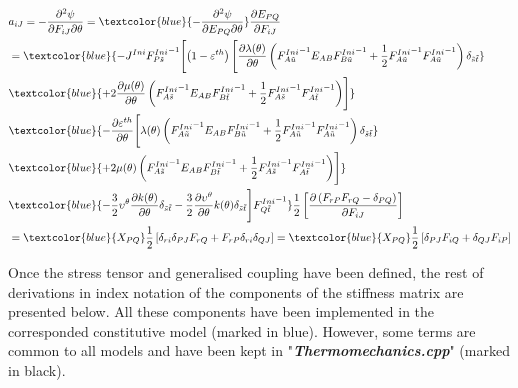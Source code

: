 \documentclass[oneside,11pt,times]{book}
\begin{document}
\begin{equation}
\begin{aligned}
\centering
&a_{iJ}=-\frac{\partial^2\psi}{\partial {F}_{iJ}\partial \theta}=\textcolor{blue}{-\frac{\partial^2\psi}{\partial {E}_{PQ}\partial \theta}}\frac{\partial{E}_{PQ}}{\partial {F}_{iJ}}\\&=\textcolor{blue}{
-J^{Ini}{{F}^{Ini}_{P\tilde{s}}}^{-1}\Biggl[\left(1-\varepsilon^{th}\right)\Biggl[\frac{\partial\lambda (\theta)}{\partial \theta} \left({{F}^{Ini}_{A\tilde{u}}}^{-1}{E}_{AB}{{F}^{Ini}_{B\tilde{u}}}^{-1}+\frac{1}{2}{{F}^{Ini}_{A\tilde{u}}}^{-1}{{F}^{Ini}_{A\tilde{u}}}^{-1}\right)\delta_{\tilde{s}\tilde{t}}}\\&
\textcolor{blue}{+2\frac{\partial\mu (\theta)}{\partial \theta} \left({{F}^{Ini}_{A\tilde{s}}}^{-1}{E}_{AB}{{F}^{Ini}_{B\tilde{t}}}^{-1}+\frac{1}{2}{{F}^{Ini}_{A\tilde{s}}}^{-1}{{F}^{Ini}_{A\tilde{t}}}^{-1}\right)\Biggr]}
\\&\textcolor{blue}{-\frac{\partial\varepsilon^{th}}{\partial \theta}\Biggl[\lambda (\theta) \left({{F}^{Ini}_{A\tilde{u}}}^{-1}{E}_{AB}{{F}^{Ini}_{B\tilde{u}}}^{-1}+\frac{1}{2}{{F}^{Ini}_{A\tilde{u}}}^{-1}{{F}^{Ini}_{A\tilde{u}}}^{-1}\right)\delta_{\tilde{s}\tilde{t}}}\\&
\textcolor{blue}{+2\mu (\theta) \left({{F}^{Ini}_{A\tilde{s}}}^{-1}{E}_{AB}{{F}^{Ini}_{B\tilde{t}}}^{-1}+\frac{1}{2}{{F}^{Ini}_{A\tilde{s}}}^{-1}{{F}^{Ini}_{A\tilde{t}}}^{-1}\right)\Biggr]}\\
&\textcolor{blue}{-\frac{3}{2}{\upsilon^{\theta}}\frac{\partial k(\theta)}{\partial\theta}\delta_{\tilde{s}\tilde{t}}-\frac{3}{2}
\frac{\partial{\upsilon^{\theta}}}{\partial \theta}k(\theta)\delta_{\tilde{s}\tilde{t}}\Biggr]{{F}^{Ini}_{Q\tilde{t}}}^{-1}}\frac{1}{2}\left[\frac{\partial\left(F_{rP}F_{rQ}-\delta_{PQ}\right)}{\partial F_{iJ}}\right]\\
&=\textcolor{blue}{X_{PQ}}\frac{1}{2}\left[\delta_{ri}\delta_{PJ}F_{rQ}+F_{rP}\delta_{ri}\delta_{QJ}\right]=\textcolor{blue}{X_{PQ}}\frac{1}{2}\left[\delta_{PJ}F_{iQ}+\delta_{QJ}F_{iP}\right]
\end{aligned}
\label{couplingtensor}
\end{equation}

Once the stress tensor and generalised coupling have been defined, the rest of derivations in index notation of the components of the stiffness matrix are presented below. All these components have been implemented in the corresponded constitutive model (marked in blue). However, some terms are common to all models and have been kept in "\textbf{\textit{Thermomechanics.cpp}}" (marked in black).
\end{document}
